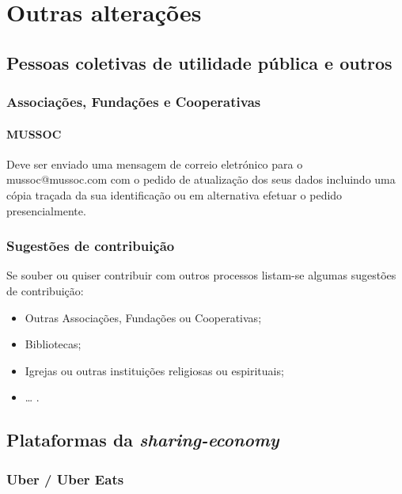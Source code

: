 
\newpage

\section{Outras alterações}

\subsection{Pessoas coletivas de utilidade pública e outros}

\subsubsection{Associações, Fundações e Cooperativas}

\paragraph{MUSSOC}

Deve ser enviado uma mensagem de correio eletrónico para o
mussoc@mussoc.com com o pedido de atualização dos seus dados incluindo
uma cópia traçada da sua identificação ou em alternativa efetuar o
pedido presencialmente.

\subsubsection{Sugestões de contribuição}

Se souber ou quiser contribuir com outros processos listam-se algumas
sugestões de contribuição:
\begin{itemize}
	\item Outras Associações, Fundações ou Cooperativas;
	\item Bibliotecas;
	\item Igrejas ou outras instituições religiosas ou espirituais;
	\item \ldots{} .
\end{itemize}

\subsection{\texorpdfstring{Plataformas da \emph{sharing-economy}}{Plataformas da sharing-economy}}

\subsubsection{Uber / Uber Eats}

